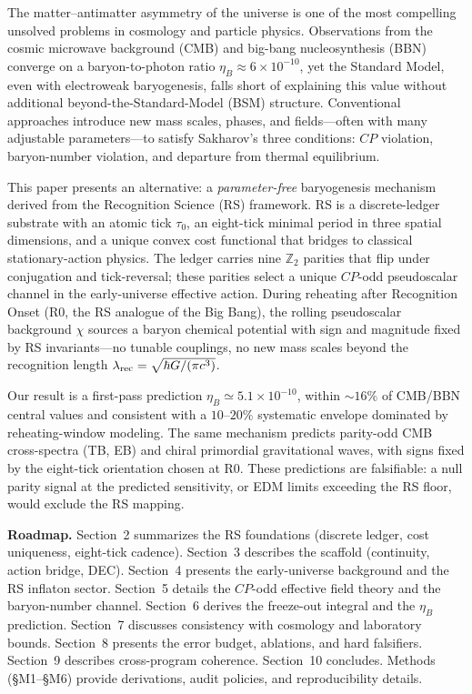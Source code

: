 \documentclass[11pt]{article}
\begin{document}
The matter–antimatter asymmetry of the universe is one of the most compelling unsolved problems in cosmology and particle physics. Observations from the cosmic microwave background (CMB) and big-bang nucleosynthesis (BBN) converge on a baryon-to-photon ratio $\eta_B\approx 6\times 10^{-10}$, yet the Standard Model, even with electroweak baryogenesis, falls short of explaining this value without additional beyond-the-Standard-Model (BSM) structure. Conventional approaches introduce new mass scales, phases, and fields—often with many adjustable parameters—to satisfy Sakharov's three conditions: $CP$ violation, baryon-number violation, and departure from thermal equilibrium.

This paper presents an alternative: a \emph{parameter-free} baryogenesis mechanism derived from the Recognition Science (RS) framework. RS is a discrete-ledger substrate with an atomic tick $\tau_0$, an eight-tick minimal period in three spatial dimensions, and a unique convex cost functional that bridges to classical stationary-action physics. The ledger carries nine $\mathbb{Z}_2$ parities that flip under conjugation and tick-reversal; these parities select a unique $CP$-odd pseudoscalar channel in the early-universe effective action. During reheating after Recognition Onset (R0, the RS analogue of the Big Bang), the rolling pseudoscalar background $\chi$ sources a baryon chemical potential with sign and magnitude fixed by RS invariants—no tunable couplings, no new mass scales beyond the recognition length $\lambda_{\rm rec}=\sqrt{\hbar G/(\pi c^3)}$.

Our result is a first-pass prediction $\eta_B\simeq 5.1\times 10^{-10}$, within $\sim 16\%$ of CMB/BBN central values and consistent with a $10$--$20\%$ systematic envelope dominated by reheating-window modeling. The same mechanism predicts parity-odd CMB cross-spectra (TB, EB) and chiral primordial gravitational waves, with signs fixed by the eight-tick orientation chosen at R0. These predictions are falsifiable: a null parity signal at the predicted sensitivity, or EDM limits exceeding the RS floor, would exclude the RS mapping.

\medskip\noindent\textbf{Roadmap.}
Section~2 summarizes the RS foundations (discrete ledger, cost uniqueness, eight-tick cadence). Section~3 describes the scaffold (continuity, action bridge, DEC). Section~4 presents the early-universe background and the RS inflaton sector. Section~5 details the $CP$-odd effective field theory and the baryon-number channel. Section~6 derives the freeze-out integral and the $\eta_B$ prediction. Section~7 discusses consistency with cosmology and laboratory bounds. Section~8 presents the error budget, ablations, and hard falsifiers. Section~9 describes cross-program coherence. Section~10 concludes. Methods (§M1–§M6) provide derivations, audit policies, and reproducibility details.
\end{document}
